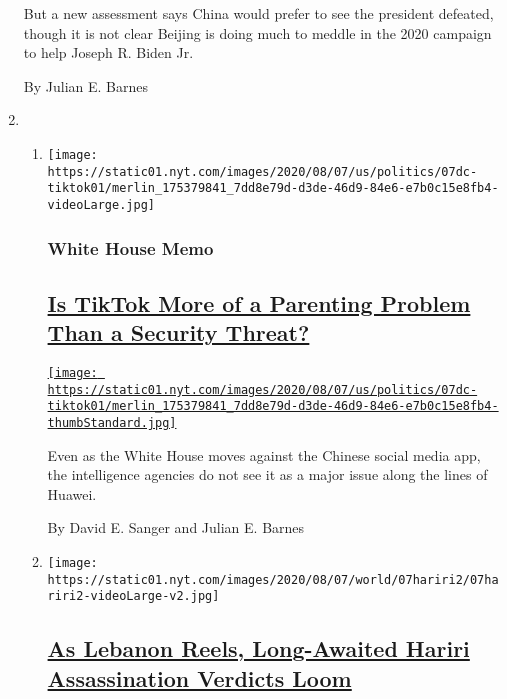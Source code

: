 \begin{enumerate}
  But a new assessment says China would prefer to see the president
  defeated, though it is not clear Beijing is doing much to meddle in
  the 2020 campaign to help Joseph R. Biden Jr.

  By Julian E. Barnes
\item
  \begin{enumerate}
  \def\labelenumii{\arabic{enumii}.}
  \item
    \texttt{[image: https://static01.nyt.com/images/2020/08/07/us/politics/07dc-tiktok01/merlin\_175379841\_7dd8e79d-d3de-46d9-84e6-e7b0c15e8fb4-videoLarge.jpg]}

    \hypertarget{white-house-memo}{%
    \subsubsection{White House Memo}\label{white-house-memo}}

    \hypertarget{is-tiktok-more-of-a-parenting-problem-than-a-security-threat}{%
    \subsection{\texorpdfstring{\href{/2020/08/07/us/politics/tiktok-security-threat.html}{Is
    TikTok More of a Parenting Problem Than a Security
    Threat?}}{Is TikTok More of a Parenting Problem Than a Security Threat?}}\label{is-tiktok-more-of-a-parenting-problem-than-a-security-threat}}

    \href{/2020/08/07/us/politics/tiktok-security-threat.html}{\texttt{[image: https://static01.nyt.com/images/2020/08/07/us/politics/07dc-tiktok01/merlin\_175379841\_7dd8e79d-d3de-46d9-84e6-e7b0c15e8fb4-thumbStandard.jpg]}}

    Even as the White House moves against the Chinese social media app,
    the intelligence agencies do not see it as a major issue along the
    lines of Huawei.

    By David E. Sanger and Julian E. Barnes
  \item
    \texttt{[image: https://static01.nyt.com/images/2020/08/07/world/07hariri2/07hariri2-videoLarge-v2.jpg]}

    \hypertarget{as-lebanon-reels-long-awaited-hariri-assassination-verdicts-loom}{%
    \subsection{\texorpdfstring{\href{/2020/08/08/world/middleeast/hariri-assassination-trial-hague.html}{As
    Lebanon Reels, Long-Awaited Hariri Assassination Verdicts
    Loom}}{As Lebanon Reels, Long-Awaited Hariri Assassination Verdicts Loom}}\label{as-lebanon-reels-long-awaited-hariri-assassination-verdicts-loom}}


\end{enumerate}
\end{enumerate}
